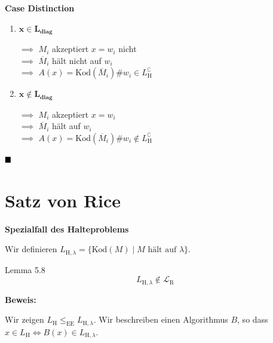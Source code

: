 \documentclass[a4paper, 11pt]{article}
\def\Lr{\mathcal{L}_\text{R}}
\newcommand\myTitle[1]{{\large \textbf {#1}}}
\begin{document}
                        \textbf{Case Distinction}
                        \begin{enumerate}[label=\Roman*.]
                            \item $\mathbf{x \in L_{\text{diag}}}$
                            \begin{center}
                                $\implies$ $M_i$ akzeptiert $x = w_i$ nicht\\
                                $\implies$ $\overline{M}_i$ hält nicht auf $w_i$\\
                                $\implies$  $A(x) = \text{Kod}(\overline{M}_i)\#w_i \in L_{\text{H}}^\complement$
                            \end{center}
                            
                            \item $\mathbf{x \notin L_{\text{diag}}}$
                            \begin{center}
                                $\implies$ $M_i$ akzeptiert $x = w_i$\\
                                $\implies$ $\overline{M}_i$ hält auf $w_i$\\
                                $\implies$  $A(x) = \text{Kod}(\overline{M}_i)\#w_i \notin L_{\text{H}}^\complement$
                            \end{center}
                        \end{enumerate}
                        $\hfill\blacksquare$
                    
                
                \section{Satz von Rice}
                
                
                    \myTitle{Spezialfall des Halteproblems}
                    
                    Wir definieren $L_{\text{H}, \lambda} = \{\text{Kod}(M) \mid M \text{ hält auf }\lambda\}$.
                    \begin{mainbox}{Lemma 5.8}
                        $$L_{\text{H}, \lambda} \notin \Lr$$
                    \end{mainbox}
                    \textbf{Beweis: }
                
                    Wir zeigen $L_\text{H} \leq_\text{EE} L_{\text{H}, \lambda}$. Wir beschreiben einen Algorithmus $B$, so dass $x \in L_\text{H} \iff B(x) \in L_{\text{H}, \lambda}$.
                
\end{document}
